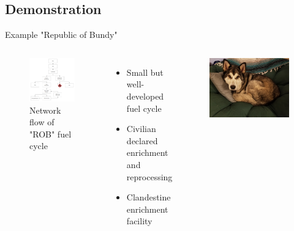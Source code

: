 \subsection{\Trailmap Demonstration}
\begin{frame}{Example "Republic of Bundy"}
    \begin{columns}
    \begin{figure}
        \centering
        \includegraphics[width=\textwidth]{images/example.png}
        \caption{Network flow of "ROB" fuel cycle}
        \label{fig:ROB}
    \end{figure}
    \begin{itemize}
        \item Small but well-developed fuel cycle
        \item Civilian declared enrichment and reprocessing
        \item Clandestine enrichment facility
    \end{itemize}
    \begin{figure}[h]
        \centering
        \includegraphics[width=0.8\linewidth]{images/Bundy.jpg}

\end{figure}
\end{columns}
\end{frame}
